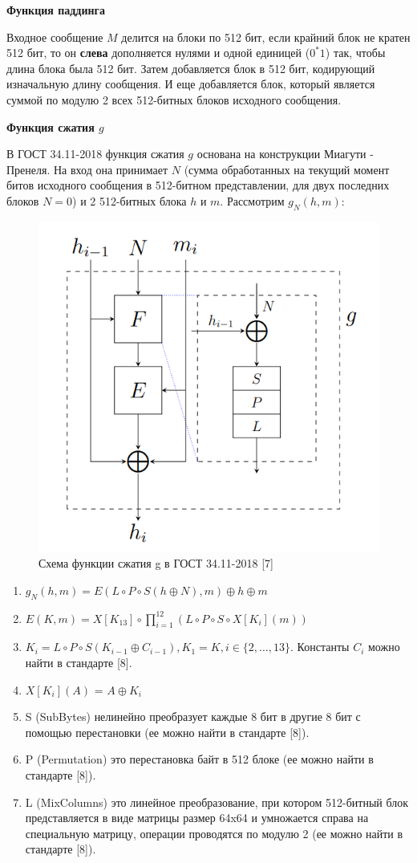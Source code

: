 \documentclass[colorthm]{./civarticle}
\begin{document}
\textbf{Функция паддинга}

Входное сообщение $M$ делится на блоки по 512 бит, если крайний блок не кратен 512 бит, то он \textbf{слева} дополняется нулями и одной единицей ($0^*1$) так, чтобы длина блока была 512 бит. Затем добавляется блок в 512 бит, кодирующий изначальную длину сообщения. И еще добавляется блок, который является суммой по модулю 2 всех 512-битных блоков исходного сообщения.

\textbf{Функция сжатия $g$}

В ГОСТ 34.11-2018 функция сжатия $g$ основана на конструкции Миагути - Пренеля. На вход она принимает $N$ (сумма обработанных на текущий момент битов исходного сообщения в 512-битном представлении, для двух последних блоков $N=0$) и 2 512-битных блока $h$ и $m$. Рассмотрим $g_N(h, m)$:

\begin{figure}[H]
    \centering
    \includegraphics[width=0.5\linewidth]{streebog_F.png}
    \caption{Схема функции сжатия g в ГОСТ 34.11-2018 [7]}
    \label{fig:enter-label}
\end{figure}

\begin{enumerate}
    \item $g_N(h, m)=E(L \circ P \circ S(h \oplus N), m) \oplus h \oplus m$
    \item $E(K, m)=X\left[K_{13}\right] \circ \prod_{i=1}^{12}\left(L \circ P \circ S \circ X\left[K_i\right](m)\right)$
    \item $K_i=L \circ P \circ S\left(K_{i-1} \oplus C_{i-1}\right), K_1=K, i \in\{2, \ldots, 13\}$. Константы $C_i$ можно найти в стандарте [8].
    \item $X[K_i](A)$ = $A \oplus K_i$
    \item S (SubBytes) нелинейно преобразует каждые 8 бит в другие 8 бит с помощью перестановки (ее можно найти в стандарте [8]).
    \item P (Permutation) это перестановка байт в 512 блоке (ее можно найти в стандарте [8]).
    \item L (MixColumns)  это линейное преобразование, при котором 512-битный блок представляется в виде матрицы размер 64x64 и умножается справа на специальную матрицу, операции проводятся по модулю 2 (ее можно найти в стандарте [8]).
\end{enumerate}
\end{document}
